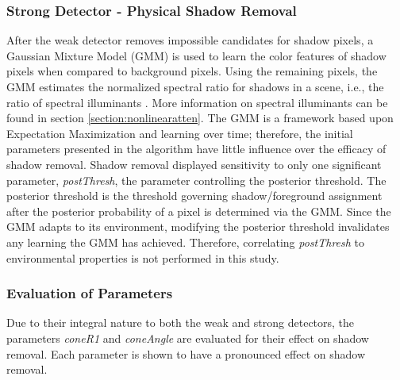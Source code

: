 \FloatBarrier
\subsubsection{Strong Detector - Physical Shadow Removal}

After the weak detector removes impossible candidates for shadow pixels, a Gaussian Mixture Model (GMM) is used to learn the color features of shadow pixels when compared to background pixels. Using the remaining pixels, the GMM estimates the normalized spectral ratio for shadows in a scene, i.e., the ratio of spectral illuminants \cite{huang2009moving, sato2015foreground, lee2017shadow}. More information on spectral illuminants can be found in section \ref{section:nonlinearatten}. The GMM is a framework based upon Expectation Maximization and learning over time; therefore, the initial parameters presented in the algorithm have little influence over the efficacy of shadow removal. Shadow removal displayed sensitivity to only one significant parameter, \textit{postThresh}, the parameter controlling the posterior threshold. The posterior threshold is the threshold governing shadow/foreground assignment after the posterior probability of a pixel is determined via the GMM. Since the GMM adapts to its environment, modifying the posterior threshold invalidates any learning the GMM has achieved. Therefore, correlating \textit{postThresh} to environmental properties is not performed in this study.

\subsubsection{Evaluation of Parameters}

Due to their integral nature to both the weak and strong detectors, the parameters \textit{coneR1} and \textit{coneAngle} are evaluated for their effect on shadow removal. Each parameter is shown to have a pronounced effect on shadow removal. 

